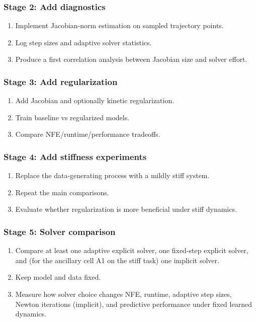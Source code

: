 \documentclass[11pt]{article}
\begin{document}
\subsubsection{Stage 2: Add diagnostics}
\begin{enumerate}[leftmargin=2em]
    \item Implement Jacobian-norm estimation on sampled trajectory points.
    \item Log step sizes and adaptive solver statistics.
    \item Produce a first correlation analysis between Jacobian size and solver effort.
\end{enumerate}

\subsubsection{Stage 3: Add regularization}
\begin{enumerate}[leftmargin=2em]
    \item Add Jacobian and optionally kinetic regularization.
    \item Train baseline vs regularized models.
    \item Compare NFE/runtime/performance tradeoffs.
\end{enumerate}

\subsubsection{Stage 4: Add stiffness experiments}
\begin{enumerate}[leftmargin=2em]
    \item Replace the data-generating process with a mildly stiff system.
    \item Repeat the main comparisons.
    \item Evaluate whether regularization is more beneficial under stiff dynamics.
\end{enumerate}

\subsubsection{Stage 5: Solver comparison}
\begin{enumerate}[leftmargin=2em]
    \item Compare at least one adaptive explicit solver, one fixed-step explicit solver, and (for the ancillary cell A1 on the stiff task) one implicit solver.
    \item Keep model and data fixed.
    \item Measure how solver choice changes NFE, runtime, adaptive step sizes, Newton iterations (implicit), and predictive performance under fixed learned dynamics.
\end{enumerate}
\end{document}
